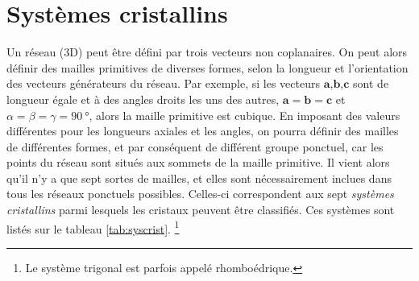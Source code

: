 \section{Systèmes cristallins}

Un réseau (3D) peut être défini par trois vecteurs non coplanaires. On peut alors
définir des mailles primitives de diverses formes, selon la longueur et l'orientation
des vecteurs générateurs du réseau.
Par exemple, si les vecteurs $\mathbf{a}$,$\mathbf{b}$,$\mathbf{c}$ sont de
longueur égale et à des angles droits les uns des autres, \ie $\mathbf{a = b = c}$
et $\alpha = \beta = \gamma = \SI{90}{\degree}$, alors la maille primitive est
cubique. En imposant des valeurs différentes pour les longueurs axiales et les angles,
on pourra définir des mailles de différentes formes, et par conséquent de différent
groupe ponctuel, car les points du réseau sont situés aux sommets de la
maille primitive. Il vient alors qu'il n'y a que sept sortes de mailles, et elles
sont nécessairement inclues dans tous les réseaux ponctuels possibles.
Celles-ci correspondent aux sept \emph{systèmes cristallins} parmi lesquels
les cristaux peuvent être classifiés.
Ces systèmes sont listés sur le tableau \ref{tab:syscrist}. \footnote{Le système
trigonal est parfois appelé rhomboédrique.}

